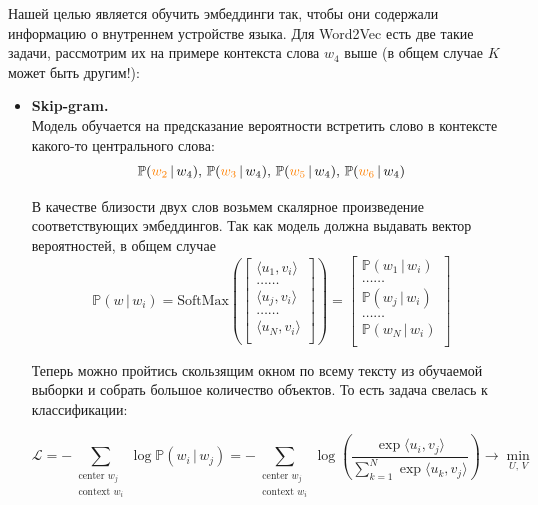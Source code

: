 \documentclass[12pt]{article}
\theoremstyle{definition} %
\theoremstyle{plain} %
\theoremstyle{remark} %
\begin{document}
Нашей целью является обучить эмбеддинги так, чтобы они содержали информацию о внутреннем устройстве языка. Для Word2Vec есть две такие задачи, рассмотрим их на примере контекста слова $w_4$ выше (в общем случае $K$ может быть другим!):

\begin{itemize}
    \item \textbf{Skip-gram.} \\
    
    Модель обучается на предсказание вероятности встретить слово в контексте какого-то центрального слова:
    \[
    \mathbb{P}(\textcolor{orange}{w_2} \,|\, w_4), \, \mathbb{P}(\textcolor{orange}{w_3} \,|\, w_4), \, \mathbb{P}(\textcolor{orange}{w_5} \,|\, w_4), \, \mathbb{P}(\textcolor{orange}{w_6} \,|\, w_4)
    \]

    В качестве близости двух слов возьмем скалярное произведение соответствующих эмбеддингов. Так как модель должна выдавать вектор вероятностей, в общем случае
    \[
    \mathbb{P}(w \,|\, w_i) = \text{SoftMax}
    \left(
    \begin{bmatrix}
        \langle u_1, v_i \rangle \\
        \dots \dots \\
        \langle u_j, v_i \rangle \\
        \dots \dots \\
        \langle u_N, v_i \rangle \\
    \end{bmatrix}
    \right)
    =
    \begin{bmatrix}
        \mathbb{P}(w_1 \,|\, w_i) \\
        \dots \dots \\
        \mathbb{P}(w_j \,|\, w_i)  \\
        \dots \dots \\
        \mathbb{P}(w_N \,|\, w_i)  \\
    \end{bmatrix}
    \]

    \pagebreak

    Теперь можно пройтись скользящим окном по всему тексту из обучаемой выборки и собрать большое количество объектов. То есть задача свелась к классификации:

    \[
    \mathcal{L} = - \sum_{\substack{\text{center } w_j \\ \text{context } w_i}} \log \mathbb{P}(w_i \,|\, w_j) = - \sum_{\substack{\text{center } w_j \\ \text{context } w_i}} \log \left(\frac{\exp \langle u_i, v_j \rangle }{\sum_{k=1}^N \exp \langle u_k, v_j \rangle}\right) \longrightarrow \min_{U, \, V}
    \]
    

\end{itemize}
\end{document}
